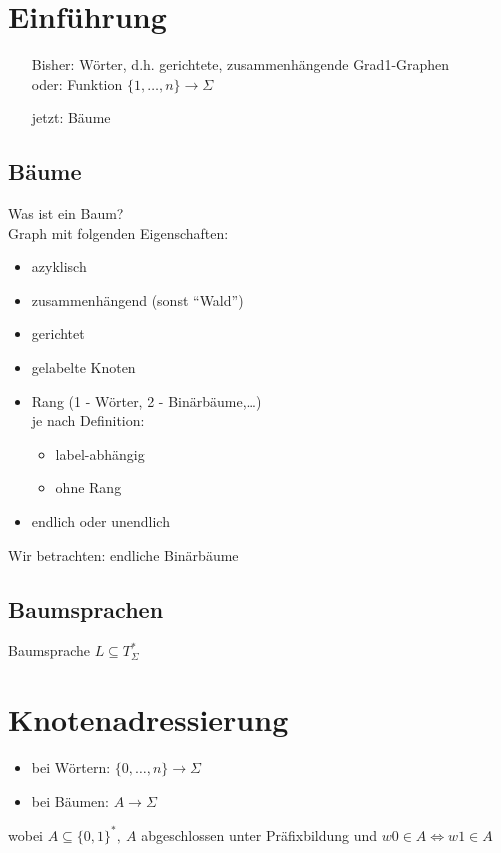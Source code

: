 \section{Einführung}
    \begin{itemize}
        \item[Bisher:] Wörter, d.h. gerichtete, zusammenhängende Grad1-Graphen\\
        oder: Funktion $\{1,\dots,n\}\rightarrow\Sigma$
        \item[jetzt:] Bäume
    \end{itemize}
    \subsection{Bäume}
        Was ist ein Baum?\\
        Graph mit folgenden Eigenschaften:
        \begin{itemize}
            \item azyklisch
            \item zusammenhängend (sonst ``Wald'')
            \item gerichtet
            \item gelabelte Knoten
            \item Rang (1 - Wörter, 2 - Binärbäume,\dots)\\
                je nach Definition:
            \begin{itemize}
                \item label-abhängig
                \item ohne Rang
            \end{itemize}
            \item endlich oder unendlich
        \end{itemize}
        Wir betrachten: endliche Binärbäume
    \subsection{Baumsprachen}
        Baumsprache $L\subseteq T^*_\Sigma$
\section{Knotenadressierung}
    \begin{itemize}
        \item bei Wörtern: $\{0,\dots,n\}\rightarrow\Sigma$
        \item bei Bäumen: $A\rightarrow\Sigma$
    \end{itemize}
    wobei $A\subseteq\{0,1\}^*,\ A$ abgeschlossen unter Präfixbildung und $w0\in A\Leftrightarrow w1\in A$
